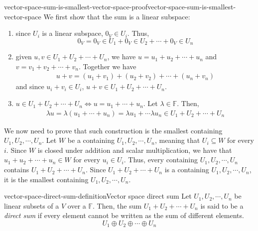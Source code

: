 \documentclass[preview]{standalone}
\begin{document}
\begin{snippetproof}{vector-space-sum-is-smallest-vector-space-proof}{vector-space-sum-is-smallest-vector-space}{}
    We first show that the sum is a linear subspace:
    \begin{enumerate}
        \item since \(U_i\) is a linear subspace, \(0_V \in U_i\).
        Thus,
        \[
            0_V = 0_V \in U_1 + 0_V \in U_2 + \cdots + 0_V \in U_n
        \]
        \item given \(u,v \in U_1 + U_2 + \cdots + U_n\), we have
        \(u=u_1 + u_2 + \cdots + u_n\) and \(v=v_1 + v_2 + \cdots + v_n\). Together we have
        \begin{align*}
            u + v = (u_1 + v_1) + (u_2 + v_2) + \cdots + (u_n + v_n)
        \end{align*}
        and since \(u_i + v_i \in U_i\), \(u+v \in U_1 + U_2 + \cdots + U_n\).
        \item \(u \in U_1 + U_2 + \cdots + U_n \iff u = u_1 + \cdots + u_n\).
        Let \(\lambda \in \mathbb{F}\). Then,
        \begin{align*}
            \lambda u = \lambda (u_1 + \cdots + u_n) = \lambda u_1 + \cdots \lambda u_n \in
            U_1 + U_2 + \cdots + U_n
        \end{align*}
    \end{enumerate}
    We now need to prove that such construction is the smallest \vectorspace containing \(U_1, U_2, \cdots, U_n\).
    Let \(W\) be a \vectorspace containing \(U_1, U_2, \cdots, U_n\),
    meaning that \(U_i \subseteq W\) for every \(i\).
    Since \(W\) is closed under addition and scalar multiplication,
    we have that \(u_1 + u_2 + \cdots + u_n \in W\) for every \(u_i \in U_i\).
    Thus, every \vectorspace containing \(U_1, U_2, \cdots, U_n\)
    contains \(U_1 + U_2 + \cdots + U_n\).
    Since \(U_1 + U_2 + \cdots + U_n\) is a \vectorspace containing \(U_1, U_2, \cdots, U_n\),
    it is the smallest \vectorspace containing \(U_1, U_2, \cdots, U_n\).
\end{snippetproof}


\begin{snippetdefinition}{vector-space-direct-sum-definition}{Vector space direct sum}
    Let \(U_1, U_2, \cdots, U_n\) be linear subsets of a \vectorspace \(V\)
    over a \field \(\mathbb{F}\). Then, the sum \(U_1 + U_2 + \cdots + U_n\)
    is said to be a \emph{direct sum} if every element cannot be written as the sum of different elements.
    \[
        U_1 \oplus U_2 \oplus \cdots \oplus U_n
    \]
\end{snippetdefinition}
\end{document}
